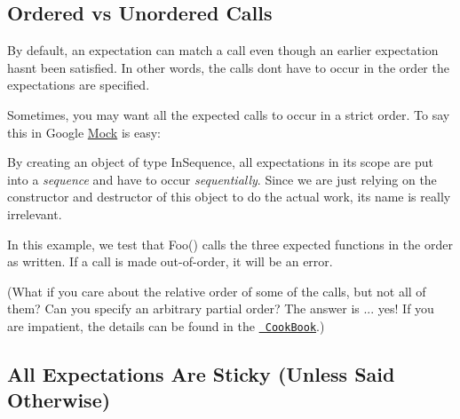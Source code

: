 \subsection*{Ordered vs Unordered Calls}

By default, an expectation can match a call even though an earlier expectation hasn\textquotesingle{}t been satisfied. In other words, the calls don\textquotesingle{}t have to occur in the order the expectations are specified.

Sometimes, you may want all the expected calls to occur in a strict order. To say this in Google \mbox{\hyperlink{class_mock}{Mock}} is easy\+:


\begin{DoxyCode}{0}
\DoxyCodeLine{  \{}
\DoxyCodeLine{}
\DoxyCodeLine{  \}}
\DoxyCodeLine{\}}
\end{DoxyCode}


By creating an object of type {\ttfamily In\+Sequence}, all expectations in its scope are put into a {\itshape sequence} and have to occur {\itshape sequentially}. Since we are just relying on the constructor and destructor of this object to do the actual work, its name is really irrelevant.

In this example, we test that {\ttfamily Foo()} calls the three expected functions in the order as written. If a call is made out-\/of-\/order, it will be an error.

(What if you care about the relative order of some of the calls, but not all of them? Can you specify an arbitrary partial order? The answer is ... yes! If you are impatient, the details can be found in the \href{CookBook.md\#expecting-partially-ordered-calls}{\texttt{ Cook\+Book}}.)

\subsection*{All Expectations Are Sticky (Unless Said Otherwise)}

